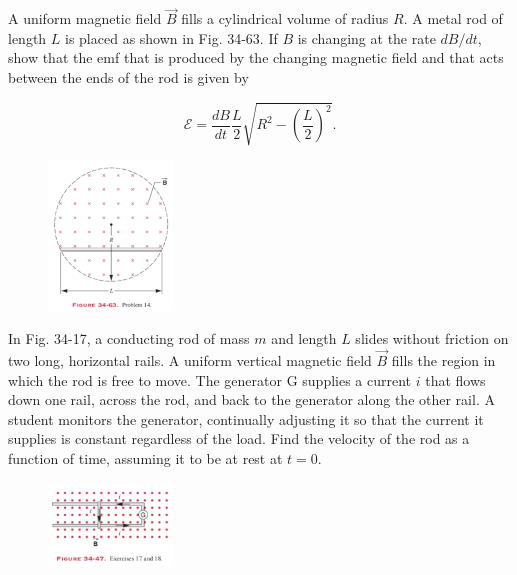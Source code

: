 \documentclass[11pt,letterpaper,boxed]{pset}
\begin{document}
    \begin{problem} [P34.14]
        A uniform magnetic field $\Vec{B}$ fills a cylindrical volume of radius $R$. A metal rod of length $L$ is placed as shown in Fig. 34-63. If $B$ is changing at the rate $dB/dt$, show that the emf that is produced by the changing magnetic field and that acts between the ends of the rod is given by 
        
        \[\mathscr{E} = \frac{dB}{dt} \frac{L}{2} \sqrt{R^2 - (\frac{L}{2})^2}.\]
    \end{problem}
    
    \begin{figure} [ht]
        \includegraphics[width=125px]{HW8Images/P34-14.png}
        \label{fig:P34-14}
    \end{figure}
    \newpage
    
    \begin{problem} [E34.17]
        In Fig. 34-17, a conducting rod of mass $m$ and length $L$ slides without friction on two long, horizontal rails. A uniform vertical magnetic field $\Vec{B}$ fills the region in which the rod is free to move. The generator G supplies a current $i$ that flows down one rail, across the rod, and back to the generator along the other rail. A student monitors the generator, continually adjusting it so that the current it supplies is constant regardless of the load. Find the velocity of the rod as a function of time, assuming it to be at rest at $t = 0$.
    \end{problem}
    
    \begin{figure} [ht]
        \includegraphics[width=125px]{HW8Images/E34-17-18.png}
        \label{fig:E34-17}
    \end{figure}
    \newpage
    
\end{document}
